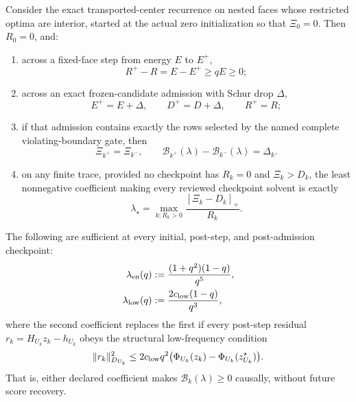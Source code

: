 \begin{proposition}
\label{prop:consumed-energy-structural-solvency}
Consider the exact transported-center recurrence on nested faces whose
restricted optima are interior, started at the actual zero initialization so
that $\Xi_0=0$.  Then $R_0=0$, and:
\begin{enumerate}
 \item across a fixed-face step from energy $E$ to $E^+$,
 \begin{equation}
  R^+-R=E-E^+\geq qE\geq0;
  \label{eq:consumed-reserve-fixed-step}
 \end{equation}
 \item across an exact frozen-candidate admission with Schur drop $\Delta$,
 \begin{equation}
  E^+=E+\Delta,\qquad D^+=D+\Delta,\qquad R^+=R;
  \label{eq:consumed-reserve-admission}
 \end{equation}
 \item if that admission contains exactly the rows selected by the named
 complete violating-boundary gate, then
 \begin{equation}
  \Xi_{k^+}=\Xi_{k^-},
  \qquad
  \mathcal B_{k^+}(\lambda)-\mathcal B_{k^-}(\lambda)=\Delta_k.
  \label{eq:consumed-reserve-admission-score}
 \end{equation}
 \item on any finite trace, provided no checkpoint has $R_k=0$ and
 $\Xi_k>D_k$, the least nonnegative coefficient making every reviewed
 checkpoint solvent is exactly
 \begin{equation}
  \lambda_\star
  =\max_{k:R_k>0}\frac{[\Xi_k-D_k]_+}{R_k}.
  \label{eq:consumed-reserve-minimum-coefficient}
 \end{equation}
\end{enumerate}

The following are sufficient at every initial, post-step, and
post-admission checkpoint:
\begin{align}
 \lambda_{\rm en}(q)
 &:=\frac{(1+q^2)(1-q)}{q^5},
 \label{eq:consumed-reserve-universal-coefficient}\\
 \lambda_{\rm low}(q)
 &:=\frac{2c_{\rm low}(1-q)}{q^3},
 \label{eq:consumed-reserve-low-frequency-coefficient}
\end{align}
where the second coefficient replaces the first if every post-step residual
$r_k=H_{U_k}z_k-h_{U_k}$ obeys the structural low-frequency condition
\begin{equation}
 \lVert r_k\rVert_{D_{U_k}}^2
 \leq 2c_{\rm low}q^2
 \bigl(\Phi_{U_k}(z_k)-\Phi_{U_k}(z_{U_k}^\star)\bigr).
 \label{eq:consumed-reserve-low-frequency-condition}
\end{equation}
That is, either declared coefficient makes
$\mathcal B_k(\lambda)\geq0$ causally, without future score recovery.
\end{proposition}

